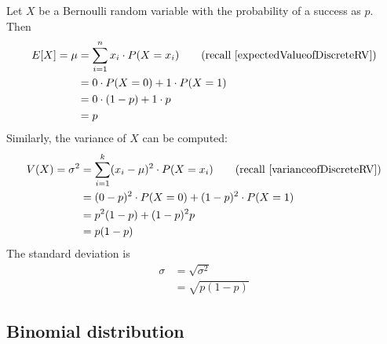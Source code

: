 Let $X$ be a Bernoulli random variable with the probability of a success as ${p}$.
Then %
\begin{align}
E[X] = \mu	&= \sum_{i=1}^{n}  x_i \cdot P(X=x_i)
				\quad\quad(\text{recall}~\ref{expectedValueofDiscreteRV})\\
			&= 0  \cdot P(X=0)+ 1 \cdot P(X=1)	\\
			&= 0 \cdot (1-p) + 1 \cdot p 		\\
			&= p
\end{align}
Similarly, the variance of $X$ can be computed:
\begin{align}
V(X) = \sigma^2	&= \sum_{i=1}^{k} (x_i - \mu)^2 \cdot P(X=x_i)
					\quad\quad(\text{recall}~\ref{varianceofDiscreteRV})\\
				&= {(0-p)^2 \cdot P(X=0) + (1-p)^2 \cdot P(X=1)} \\
				&= {p^2(1-p) + (1-p)^2p} \\
				&= {p(1-p)}
\end{align}
The standard deviation is 
\begin{align}
\sigma	&=	\sqrt{ \sigma^{2} }	\\
		&=	\sqrt{p(1-p)}
\end{align}




















\subsection{Binomial distribution}
\label{binomialModel}


